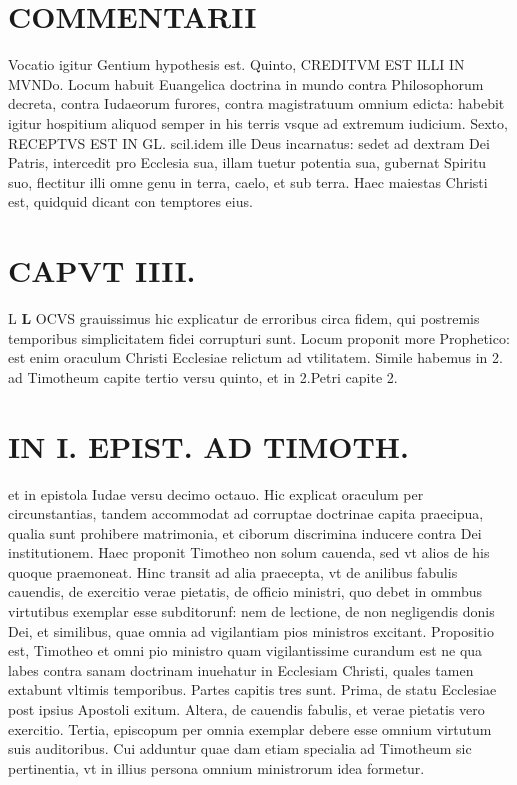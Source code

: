 \documentclass{article}
\begin{document}
\begin{pages}
\section*{COMMENTARII }
\marginpar{[ p.82 ]}\pstart Vocatio igitur Gentium hypothesis est.  \pend\pstart Quinto, CREDITVM EST ILLI IN MVNDo. Locum habuit Euangelica doctrina in mundo contra Philosophorum decreta, contra Iudaeorum furores, contra magistratuum omnium edicta: habebit igitur hospitium aliquod semper in his terris vsque ad extremum iudicium.  \pend\pstart Sexto, RECEPTVS EST IN GL. scil.idem ille Deus incarnatus: sedet ad dextram Dei Patris, intercedit pro Ecclesia sua, illam tuetur potentia sua, gubernat Spiritu suo, flectitur illi omne genu in terra, caelo, et sub terra. Haec maiestas Christi est, quidquid dicant con temptores eius.  \pend
\endnumbering\beginnumbering\section{CAPVT IIII.}L \pstart \textbf{L} OCVS grauissimus hic explicatur de erroribus circa fidem, qui postremis temporibus simplicitatem fidei corrupturi sunt. Locum proponit more Prophetico: est enim oraculum Christi Ecclesiae relictum ad vtilitatem. Simile habemus in 2. ad Timotheum capite tertio versu quinto, et in 2.Petri capite 2.  \pend
\section*{IN I. EPIST. AD TIMOTH. }
\marginpar{[ p.83 ]}\pstart et in epistola Iudae versu decimo octauo. Hic explicat oraculum per circunstantias, tandem accommodat ad corruptae doctrinae capita praecipua, qualia sunt prohibere matrimonia, et ciborum discrimina inducere contra Dei institutionem.  \pend\pstart Haec proponit Timotheo non solum cauenda, sed vt alios de his quoque praemoneat. Hinc transit ad alia praecepta, vt de anilibus fabulis cauendis, de exercitio verae pietatis, de officio ministri, quo debet in ommbus virtutibus exemplar esse subditorunf: nem de lectione, de non negligendis donis Dei, et similibus, quae omnia ad vigilantiam pios ministros excitant.  \pend\pstart Propositio est, Timotheo et omni pio ministro quam vigilantissime curandum est ne qua labes contra sanam doctrinam inuehatur in Ecclesiam Christi, quales tamen extabunt vltimis temporibus.  \pend\pstart Partes capitis tres sunt. Prima, de statu Ecclesiae post ipsius Apostoli exitum. Altera, de cauendis fabulis, et verae pietatis vero exercitio. Tertia, episcopum per omnia exemplar debere esse omnium virtutum suis auditoribus. Cui adduntur quae dam etiam specialia ad Timotheum sic pertinentia, vt in illius persona omnium ministrorum idea formetur.  \pend

\end{pages}
\end{document}
